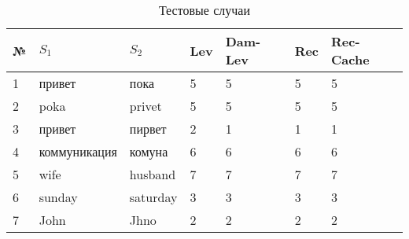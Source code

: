 \begin{table}[H]
	\centering
	\caption{\label{table:tests} Тестовые случаи}
	\begin{center}
		\begin{tabular}{|l|l|l|l|l|l|l|}
			\hline № & $S_1$ & $S_2$ & Lev & Dam-Lev & Rec & Rec-Cache \\ \hline
			1 & привет & пока & 5 & 5 & 5 & 5 \\ \hline
			2 & poka & privet & 5 & 5 & 5 & 5 \\ \hline
			3 & привет & пирвет & 2 & 1 & 1 & 1 \\ \hline
			4 & коммуникация & комуна & 6 & 6 & 6 & 6 \\ \hline
			5 & wife & husband & 7 & 7 & 7 & 7 \\ \hline
			6 & sunday & saturday & 3 & 3 & 3 & 3 \\ \hline
			7 & John & Jhno & 2 & 2 & 2 & 2 \\ \hline
		\end{tabular}
	\end{center}
\end{table}